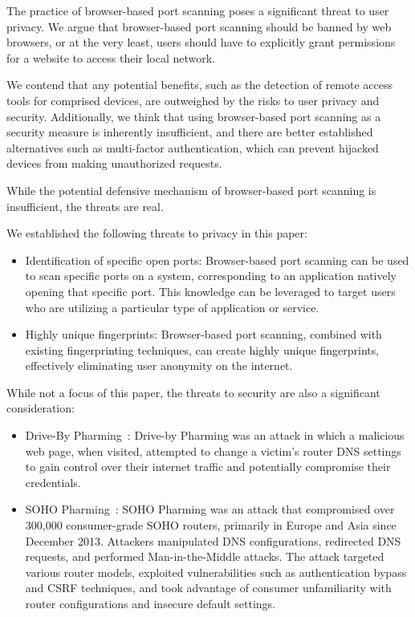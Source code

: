 The practice of browser-based port scanning poses a significant threat to user privacy. We argue that browser-based port scanning should be banned by web browsers, or at the very least, users should have to explicitly grant permissions for a website to access their local network. 

We contend that any potential benefits, such as the detection of remote access tools for comprised devices, are outweighed by the risks to user privacy and security.
Additionally, we think that using browser-based port scanning as a security measure is inherently insufficient, and there are better established alternatives such as multi-factor authentication, which can prevent hijacked devices from making unauthorized requests.

While the potential defensive mechanism of browser-based port scanning is insufficient, the threats are real.

We established the following threats to privacy in this paper:
\begin{itemize}
    \item Identification of specific open ports: Browser-based port scanning can be used to scan specific ports on a system, corresponding to an application natively opening that specific port. This knowledge can be leveraged to target users who are utilizing a particular type of application or service.
    \item Highly unique fingerprints: Browser-based port scanning, combined with existing fingerprinting techniques, can create highly unique fingerprints, effectively eliminating user anonymity on the internet.
\end{itemize}

While not a focus of this paper, the threats to security are also a significant consideration:
\begin{itemize}
    \item Drive-By Pharming~: Drive-by Pharming was an attack in which a malicious web page, when visited, attempted to change a victim's router DNS settings to gain control over their internet traffic and potentially compromise their credentials.
    \item SOHO Pharming~: SOHO Pharming was an attack that compromised over 300,000 consumer-grade SOHO routers, primarily in Europe and Asia since December 2013. Attackers manipulated DNS configurations, redirected DNS requests, and performed Man-in-the-Middle attacks. The attack targeted various router models, exploited vulnerabilities such as authentication bypass and CSRF techniques, and took advantage of consumer unfamiliarity with router configurations and insecure default settings.
\end{itemize}

